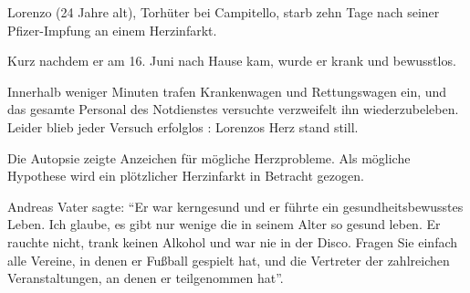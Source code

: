 Lorenzo (24 Jahre alt), Torhüter bei Campitello, starb zehn Tage nach seiner
Pfizer-Impfung an einem Herzinfarkt.

Kurz nachdem er am 16. Juni nach Hause kam, wurde er krank und bewusstlos.

Innerhalb weniger Minuten trafen Krankenwagen und Rettungswagen ein, und das
gesamte Personal des Notdienstes versuchte verzweifelt ihn
wiederzubeleben. Leider blieb jeder Versuch erfolglos : Lorenzos Herz stand
still.

Die Autopsie zeigte Anzeichen für mögliche Herzprobleme. Als mögliche Hypothese
wird ein plötzlicher Herzinfarkt in Betracht gezogen.

Andreas Vater sagte: “Er war kerngesund und er führte ein gesundheitsbewusstes
Leben. Ich glaube, es gibt nur wenige die in seinem Alter so gesund leben. Er
rauchte nicht, trank keinen Alkohol und war nie in der Disco. Fragen Sie einfach
alle Vereine, in denen er Fußball gespielt hat, und die Vertreter der
zahlreichen Veranstaltungen, an denen er teilgenommen hat”.
